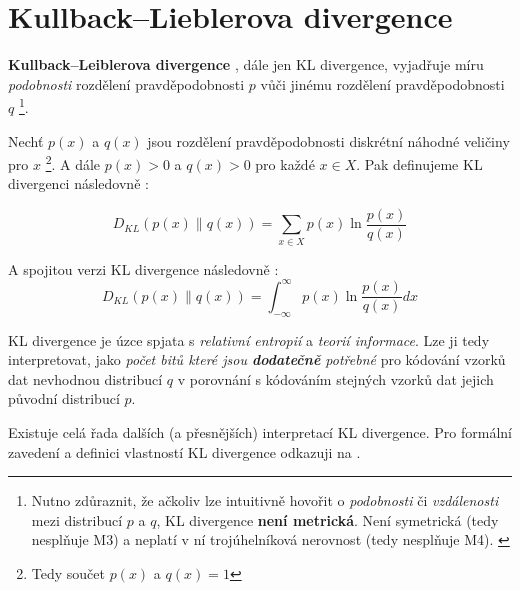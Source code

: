 \section{Kullback–Lieblerova divergence}
\label{sec:kl_divergence}

\textbf{Kullback–Leiblerova divergence} \cite{Kullback1951}, dále jen KL divergence, vyjadřuje míru \emph{podobnosti} rozdělení pravděpodobnosti $p$ vůči jinému rozdělení pravděpodobnosti $q$
\footnote{Nutno zdůraznit, že ačkoliv lze intuitivně hovořit o \emph{podobnosti} či \emph{vzdálenosti} mezi distribucí $p$ a $q$, KL divergence \textbf{není metrická}. Není symetrická (tedy nesplňuje M3) a neplatí v ní trojúhelníková nerovnost (tedy nesplňuje M4). \cite{Phillips2021}}.


Nechť $p(x)$ a $q(x)$ jsou rozdělení pravděpodobnosti diskrétní náhodné veličiny pro $x$
\footnote{Tedy součet $p(x)$ a $q(x) = 1$}.
A dále $p(x) > 0$ a $q(x) > 0$ pro každé $x \in X$. Pak definujeme KL divergenci následovně \cite{Murphy2022}:

\begin{equation}
    D_{KL}(p(x) \| q(x)) = \sum_{x \in X}^{}p(x)\ln{\frac{p(x)}{q(x)}}
\end{equation}

A spojitou verzi KL divergence následovně \cite{Murphy2022}:
\begin{equation}
    D_{KL}(p(x) \| q(x)) = \int_{-\infty}^{\infty}p(x)\ln{\frac{p(x)}{q(x)}}dx 
\end{equation}

KL divergence je úzce spjata s \emph{relativní entropií} a \emph{teorií informace}.
Lze ji tedy interpretovat, jako \emph{počet bitů které jsou \textbf{dodatečně} potřebné} pro kódování vzorků dat nevhodnou distribucí $q$ v porovnání s kódováním stejných vzorků dat jejich původní distribucí $p$.

Existuje celá řada dalších (a přesnějších) interpretací KL divergence. Pro formální zavedení a definici vlastností KL divergence odkazuji na \cite[kap. 5.1]{Murphy2023}.
